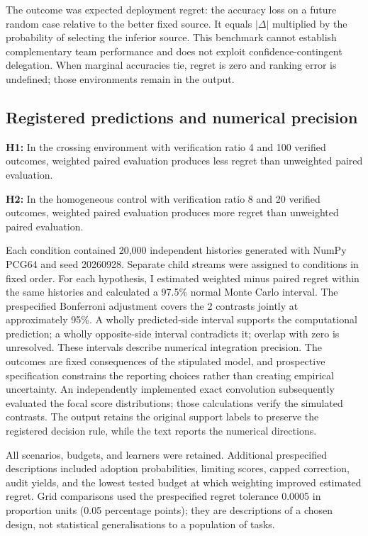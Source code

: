 \documentclass[
  british,
  11pt,
]{article}
\begin{document}
The outcome was expected deployment regret: the accuracy loss on a
future random case relative to the better fixed source. It equals
\(|\Delta|\) multiplied by the probability of selecting the inferior
source. This benchmark cannot establish complementary team performance
and does not exploit confidence-contingent delegation. When marginal
accuracies tie, regret is zero and ranking error is undefined; those
environments remain in the output.

\subsection{Registered predictions and numerical
precision}\label{registered-predictions-and-numerical-precision}

\textbf{H1:} In the crossing environment with verification ratio 4 and
100 verified outcomes, weighted paired evaluation produces less regret
than unweighted paired evaluation.

\textbf{H2:} In the homogeneous control with verification ratio 8 and 20
verified outcomes, weighted paired evaluation produces more regret than
unweighted paired evaluation.

Each condition contained 20,000 independent histories generated with
NumPy PCG64 and seed 20260928. Separate child streams were assigned to
conditions in fixed order. For each hypothesis, I estimated weighted
minus paired regret within the same histories and calculated a 97.5\%
normal Monte Carlo interval. The prespecified Bonferroni adjustment
covers the 2 contrasts jointly at approximately 95\%. A wholly
predicted-side interval supports the computational prediction; a wholly
opposite-side interval contradicts it; overlap with zero is unresolved.
These intervals describe numerical integration precision. The outcomes
are fixed consequences of the stipulated model, and prospective
specification constrains the reporting choices rather than creating
empirical uncertainty. An independently implemented exact convolution
subsequently evaluated the focal score distributions; those calculations
verify the simulated contrasts. The output retains the original support
labels to preserve the registered decision rule, while the text reports
the numerical directions.

All scenarios, budgets, and learners were retained. Additional
prespecified descriptions included adoption probabilities, limiting
scores, capped correction, audit yields, and the lowest tested budget at
which weighting improved estimated regret. Grid comparisons used the
prespecified regret tolerance 0.0005 in proportion units (0.05
percentage points); they are descriptions of a chosen design, not
statistical generalisations to a population of tasks.
\end{document}
